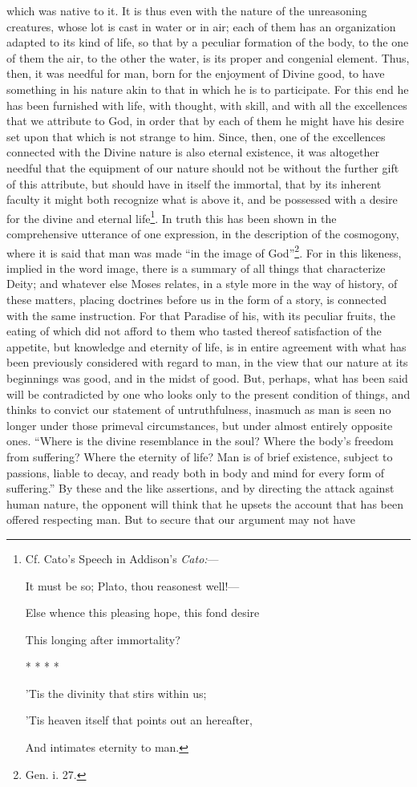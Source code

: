which was native to it. It is thus even with the nature of the unreasoning creatures, whose lot is cast in water or in air; each of them has an organization adapted to its kind of life, so that by a peculiar formation of the body, to the one of them the air, to the other the water, is its proper and congenial element. Thus, then, it was needful for man, born for the enjoyment of Divine good, to have something in his nature akin to that in which he is to participate. For this end he has been furnished with life, with thought, with skill, and with all the excellences that we attribute to God, in order that by each of them he might have his desire set upon that which is not strange to him. Since, then, one of the excellences connected with the Divine nature is also eternal existence, it was altogether needful that the equipment of our nature should not be without the further gift of this attribute, but should have in itself the immortal, that by its inherent faculty it might both recognize what is above it, and be possessed with a desire for the divine and eternal life\footnote{Cf. Cato’s Speech in Addison’s \emph{Cato:}— \par It must be so; Plato, thou reasonest well!— \par Else whence this pleasing hope, this fond desire \par This longing after immortality? \par * * * * * \par ’Tis the divinity that stirs within us; \par ’Tis heaven itself that points out an hereafter, \par And intimates eternity to man.}. In truth this has been shown in the comprehensive utterance of one expression, in the description of the cosmogony, where it is said that man was made “in the image of God”\footnote{Gen. i. 27.}. For in this likeness, implied in the word image, there is a summary of all things that characterize Deity; and whatever else Moses relates, in a style more in the way of history, of these matters, placing doctrines before us in the form of a story, is connected with the same instruction. For that Paradise of his, with its peculiar fruits, the eating of which did not afford to them who tasted thereof satisfaction of the appetite, but knowledge and eternity of life, is in entire agreement with what has been previously considered with regard to man, in the view that our nature at its beginnings was good, and in the midst of good. But, perhaps, what has been said will be contradicted by one who looks only to the present condition of things, and thinks to convict our statement of untruthfulness, inasmuch as man is seen no longer under those primeval circumstances, but under almost entirely opposite ones. “Where is the divine resemblance in the soul? Where the body’s freedom from suffering? Where the eternity of life? Man is of brief existence, subject to passions, liable to decay, and ready both in body and mind for every form of suffering.” By these and the like assertions, and by directing the attack against human nature, the opponent will think that he upsets the account that has been offered respecting man. But to secure that our argument may not have 